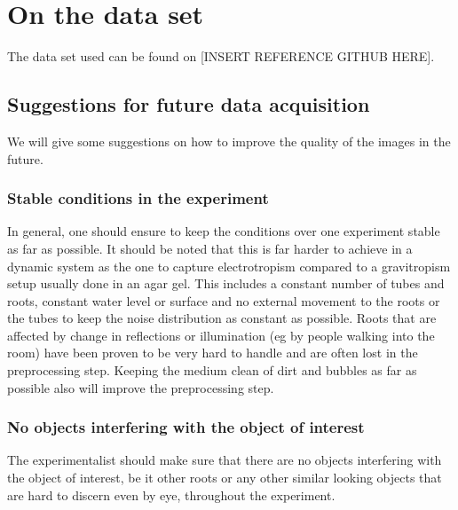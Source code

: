 

\chapter{On the data set}

The data set used can be found on [INSERT REFERENCE GITHUB HERE].

\section{Suggestions for future data acquisition}

We will give some suggestions on how to improve the quality of the images in the future.


\subsection{Stable conditions in the experiment}

In general, one should ensure to keep the conditions over one experiment stable as far as possible. It should be noted that this is far harder to achieve in a dynamic system as the one to capture electrotropism compared to a gravitropism setup usually done in an agar gel. 
This includes a constant number of tubes and roots, constant water level or surface and no external movement to the roots or the tubes to keep the noise distribution as constant as possible. Roots that are affected by change in reflections or illumination (eg by people walking into the room) have been proven to be very hard to handle and are often lost in the preprocessing step. 
Keeping the medium clean of dirt and bubbles as far as possible also will improve the preprocessing step. 


\subsection{No objects interfering with the object of interest}

The experimentalist should make sure that there are no objects interfering with the object of interest, be it other roots or any other similar looking objects that are hard to discern even by eye, throughout the experiment.

